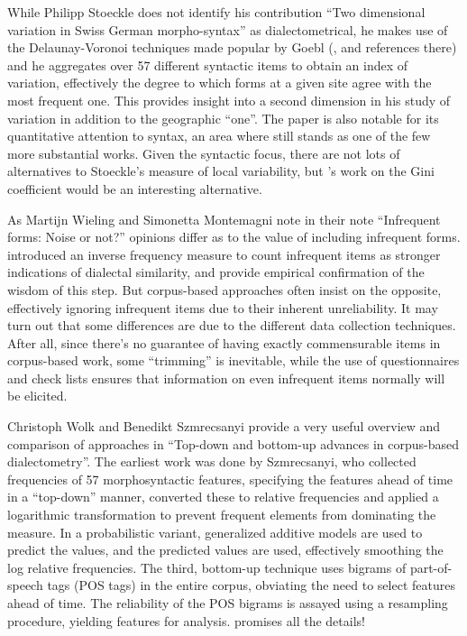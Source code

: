 \documentclass[output=paper]{LSP/langsci}
\begin{document}
While Philipp Stoeckle does not identify his contribution “Two dimensional variation in Swiss German morpho-syntax” as dialectometrical, he makes use of the Delaunay-Voronoi techniques made popular by Goebl (\citeyear{goebl_recent_2006}, and references there) and he aggregates over 57 different syntactic items to obtain an index of variation, effectively the degree to which forms at a given site agree with the most frequent one.  This provides insight into a second dimension in his study of variation in addition to the geographic “one”. The paper is also notable for its quantitative attention to syntax, an area where \citet{spruit_quantitative_2008} still stands as one of the few more substantial works. Given the syntactic focus, there are not lots of alternatives to Stoeckle’s measure of local variability, but \citeauthor{kretzschmar_scaled_2013}'s work \citeyearpar{kretzschmar_scaled_2013} on the Gini coefficient would be an interesting alternative. 

As Martijn Wieling and Simonetta Montemagni note in their note “Infrequent forms: Noise or not?” opinions differ as to the value of including infrequent forms. \citet{goebl_dialektometrische_1984} introduced an inverse frequency measure to count infrequent items as stronger indications of dialectal similarity, and \citet{nerbonne_toward_2007} provide empirical confirmation of the wisdom of this step. But corpus-based approaches often insist on the opposite, effectively ignoring infrequent items due to their inherent unreliability. It may turn out that some differences are due to the different data collection techniques. After all, since there’s no guarantee of having exactly commensurable items in corpus-based work, some “trimming” is inevitable, while the use of questionnaires and check lists ensures that information on even infrequent items normally will be elicited.

Christoph Wolk and Benedikt Szmrecsanyi provide a very useful overview and comparison of approaches in “Top-down and bottom-up advances in corpus-based dialectometry”. The earliest work was done by Szmrecsanyi, who collected frequencies of 57 morphosyntactic features, specifying the features ahead of time in a “top-down” manner, converted these to relative frequencies and applied a logarithmic transformation to prevent frequent elements from dominating the measure. In a probabilistic variant, generalized additive models are used to predict the values, and the predicted values are used, effectively smoothing the log relative frequencies. The third, bottom-up technique uses bigrams of part-of-speech tags (POS tags) in the entire corpus, obviating the need to select features ahead of time. The reliability of the POS bigrams is assayed using a resampling procedure, yielding features for analysis. \citet{wolk_integrating_2014} promises all the details!
\end{document}
